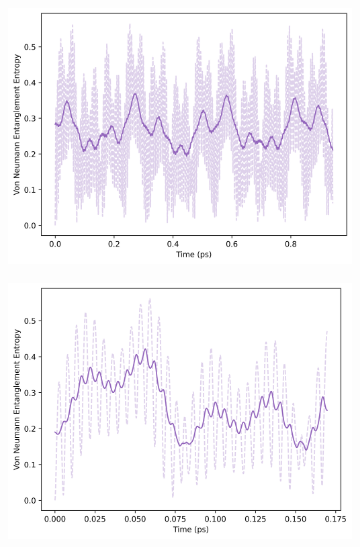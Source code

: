 \documentclass[11pt]{article}
\begin{document}
\begin{figure}[H]
    \centering
    \begin{subfigure}{0.49\textwidth}
        \centering
        \includegraphics[width=\linewidth]{Research Project/Code/results/ExVib/Closed/Envelope/vne_eg.png}
        \caption{}
        \label{fig:EVM_CQS_Ent_env_eg}
    \end{subfigure}
    \hfill
    \begin{subfigure}{0.49\textwidth}
        \centering
        \includegraphics[width=\linewidth]{Research Project/Code/results/ExVib/Closed/Fast/vne_eg.png}
        \caption{}
        \label{fig:EVM_CQS_Ent_fast_eg}
    \end{subfigure}
    
    \caption{}
    \label{fig:EVM_CQS_Ent_eg}
\end{figure}
\end{document}
